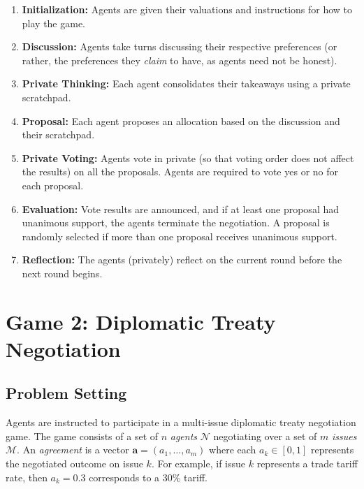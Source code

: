 \begin{enumerate}
    \item \textbf{Initialization:} Agents are given their valuations and instructions for how to play the game.
    \item \textbf{Discussion:} Agents take turns discussing their respective preferences (or rather, the preferences they \emph{claim} to have, as agents need not be honest).
    \item \textbf{Private Thinking:} Each agent consolidates their takeaways using a private scratchpad.
    \item \textbf{Proposal:} Each agent proposes an allocation based on the discussion and their scratchpad.
    \item \textbf{Private Voting:} Agents vote in private (so that voting order does not affect the results) on all the proposals. Agents are required to vote yes or no for each proposal.
    \item \textbf{Evaluation:} Vote results are announced, and if at least one proposal had unanimous support, the agents terminate the negotiation. A proposal is randomly selected if more than one proposal receives unanimous support.
    \item \textbf{Reflection:} The agents (privately) reflect on the current round before the next round begins. 
\end{enumerate}

\section{Game 2: Diplomatic Treaty Negotiation}

\subsection{Problem Setting}
\label{sec:game_2_problem_setting}

Agents are instructed to participate in a multi-issue diplomatic treaty negotiation game.
The game consists of a set of $n$ \emph{agents} $\mathcal{N}$ negotiating over a set of $m$ \emph{issues} $\mathcal{M}$.
An \emph{agreement} is a vector $\bm{a} = (a_1, \dots, a_m)$ where each $a_k \in [0,1]$ represents the negotiated outcome on issue $k$.
For example, if issue $k$ represents a trade tariff rate, then $a_k = 0.3$ corresponds to a 30\% tariff.

